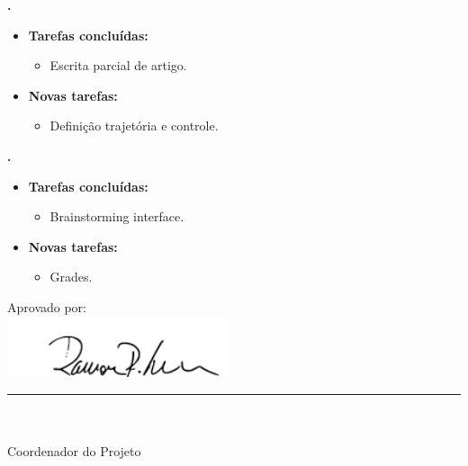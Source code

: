   \textbf{\renan.} 
	\begin{itemize}
		\item \textbf{Tarefas concluídas:}
			\begin{itemize}    
				\item Escrita parcial de artigo.
			\end{itemize}
		
		\item \textbf{Novas tarefas:}
			\begin{itemize} 
			    \item Definição trajetória e controle.
			\end{itemize}
	\end{itemize}	
			
   \textbf{\julia.} 
	\begin{itemize}
		\item \textbf{Tarefas concluídas:}
			\begin{itemize}    
				\item Brainstorming interface.
			\end{itemize}
		
		\item \textbf{Novas tarefas:}
			\begin{itemize} 
			    \item Grades.
			\end{itemize}
	\end{itemize}		





\vspace{5mm}%
\parbox[t]{70mm}{
  Aprovado por: \\[5mm]
  \centering
  \includegraphics[width=65mm]{figs/logo/assinatura-ramon.png} \\[-4mm]
  \rule[2mm]{70mm}{0.1mm} \\
  \ramon \\[1mm]
  Coordenador do Projeto \\
}

\fim